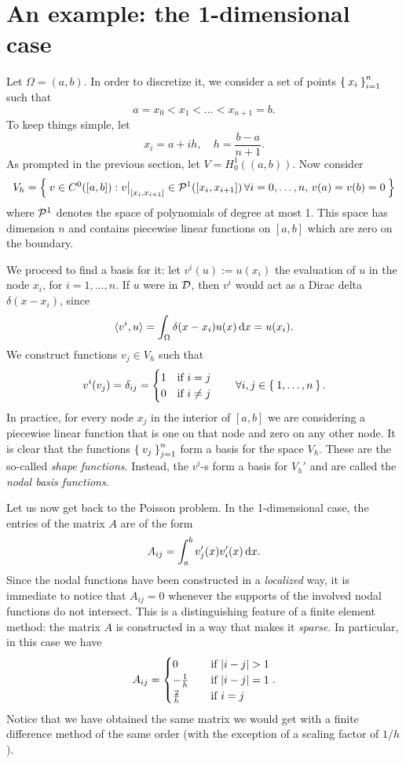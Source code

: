 \section{An example: the 1-dimensional case}


Let $\Omega = (a,b)$. In order to discretize it, we consider a set of points $\Set{x_i}_{i=1}^n$ such that
\[
a = x_0 < x_1 < \dots < x_{n+1} = b.
\]
To keep things simple, let
\[
x_i = a+ih, \quad h = \frac{b-a}{n+1}.
\]
As prompted in the previous section, let $V=H_0^1((a,b))$. Now consider
\[
V_h = \Set{v \in C^0([a,b]): \restr{v}{[x_i, x_{i+1}]}\in \P^1([x_i, x_{i+1}]) \,\forall i=0,\dots,n, \, v(a)=v(b)=0}
\]
where $\P^1$ denotes the space of polynomials of degree at most 1. This space has dimension $n$ and contains piecewise linear functions on $[a,b]$ which are zero on the boundary.

We proceed to find a basis for it: let $v^i(u) := u(x_i)$ the evaluation of $u$ in the node $x_i$, for $i=1,\dots,n$. If $u$ were in $\D$, then $v^i$ would act as a Dirac delta $\delta(x-x_i)$, since
\[
\langle v^i, u \rangle = \int_\Omega \delta(x-x_i) u(x) \diff x = u(x_i).
\]
We construct functions $v_j \in V_h$ such that
\[
v^i(v_j) = \delta_{ij} = \begin{cases}
1 \quad \text{if } i=j \\
0 \quad \text{if } i\ne j
\end{cases}
\quad \forall i,j \in \Set{1,\dots,n}.
\]
In practice, for every node $x_j$ in the interior of $[a,b]$ we are considering a piecewise linear function that is one on that node and zero on any other node. It is clear that the functions $\Set{v_j}_{j=1}^{n}$ form a basis for the space $V_h$. These are the so-called \emph{shape functions}. Instead, the $v^i$-s form a basis for $V_h'$ and are called the \emph{nodal basis functions}.

Let us now get back to the Poisson problem. In the 1-dimensional case, the entries of the matrix $A$ are of the form
\[
A_{ij} = \int_a^b v_j'(x) v_i'(x) \diff x.
\]
Since the nodal functions have been constructed in a \emph{localized} way, it is immediate to notice that $A_{ij} = 0$ whenever the supports of the involved nodal functions do not intersect. This is a distinguishing feature of a finite element method: the matrix $A$ is constructed in a way that makes it \emph{sparse}. In particular, in this case we have
\[
A_{ij} = \begin{cases}
0 \quad &\text{if } \abs{i-j}>1 \\
-\frac{1}{h} \quad &\text{if } \abs{i-j}=1 \\
\frac{2}{h} \quad &\text{if } i=j
\end{cases}.
\]
Notice that we have obtained the same matrix we would get with a finite difference method of the same order (with the exception of a scaling factor of $1/h$).

